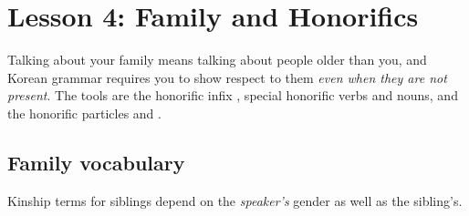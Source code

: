 \chapter{Lesson 4: Family and Honorifics}

Talking
about your family means talking about people older than you, and Korean grammar requires
you to show respect to them \emph{even when they are not present}. The tools are the
honorific infix , special honorific verbs and nouns, and the
honorific particles  and .

\section{Family vocabulary}

Kinship terms for siblings depend on the \emph{speaker's} gender as well as the sibling's.

